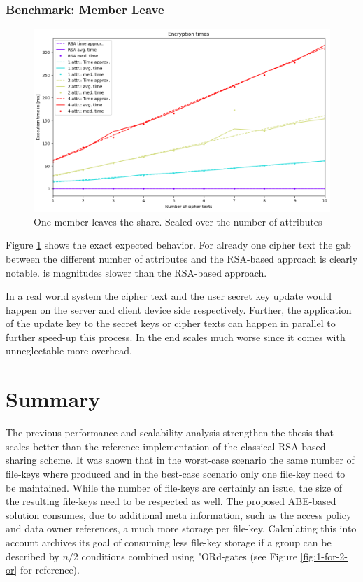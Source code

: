 \subsubsection{Benchmark: Member Leave}
\begin{figure}[!ht]
\centering
    \includegraphics[width=\linewidth]{img/eval-leave/leave_attr_1_users_2.png}
    \caption{One member leaves the share. Scaled over the number of attributes}
    \label{fig:member-leave}
\end{figure}

Figure \ref{fig:member-leave} shows the exact expected behavior. For already one cipher text the gab between the different number of attributes and the RSA-based approach is clearly notable. \name is magnitudes slower than the RSA-based approach.

In a real world system the cipher text and the user secret key update would happen on the server and client device side respectively. Further, the application of the update key to the secret keys or cipher texts can happen in parallel to further speed-up this process. In the end \name scales much worse since it comes with unneglectable more overhead. 

\section{Summary}
The previous performance and scalability analysis strengthen the thesis that \name scales better than the reference implementation of the classical RSA-based sharing scheme. It was shown that in the worst-case scenario the same number of file-keys where produced and in the best-case scenario only one file-key need to be maintained. While the number of file-keys are certainly an issue, the size of the resulting file-keys need to be respected as well. The proposed ABE-based solution consumes, due to additional meta information, such as the access policy and data owner references, a much more storage per file-key. Calculating this into account \name archives its goal of consuming less file-key storage if a group can be described by $n/2$ conditions combined using "ORd-gates (see Figure \ref{fig:1-for-2-or} for reference).

